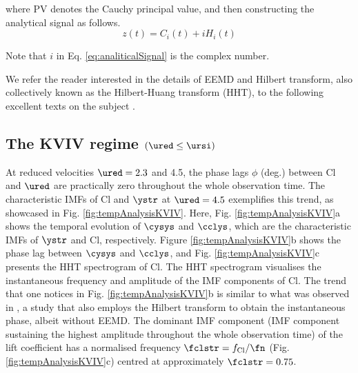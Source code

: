 \documentclass[a4paper,fleqn]{cas-sc}
\begin{document}
\noindent where PV denotes the Cauchy principal value, and then constructing the analytical signal as follows.
\begin{equation}
  z \left( t \right) = C_{i} \left( t \right) + i H_{i} \left( t \right)
  \label{eq:analiticalSignal}
\end{equation}

\noindent Note that $i$ in Eq. \ref{eq:analiticalSignal} is the complex number.

We refer the reader interested in the details of EEMD and Hilbert transform, also collectively known as the Hilbert-Huang transform (HHT), to the following excellent texts on the subject \citep{Huang2005,Huang2014}.
\subsection{The KVIV regime $\left ( \ured \leq \ursi \right )$} \label{ssec:phaseLag}
At reduced velocities  $\ured = 2.3$ and 4.5, the phase lags  $\phi$ (deg.) between Cl and  $\ured$ are practically zero throughout the whole observation time. The characteristic IMFs of Cl and  $\ystr$ at $\ured = 4.5$ exemplifies this trend, as showcased in Fig. \ref{fig:tempAnalysisKVIV}. Here, Fig. \ref{fig:tempAnalysisKVIV}a shows the temporal evolution of $\cysys$ and $\cclys$, which are the characteristic IMFs of $\ystr$ and Cl, respectively. Figure \ref{fig:tempAnalysisKVIV}b shows the phase lag between $\cysys$ and $\cclys$, and Fig. \ref{fig:tempAnalysisKVIV}c presents the HHT spectrogram of Cl. The HHT spectrogram visualises the instantaneous frequency and amplitude of the IMF components of Cl. The trend that one notices in Fig. \ref{fig:tempAnalysisKVIV}b is similar to what was observed in \citet{Khalak1999}, a study that also employs the Hilbert transform to obtain the instantaneous phase, albeit without EEMD. The dominant IMF component (IMF component sustaining the highest amplitude throughout the whole observation time) of the lift coefficient has a normalised frequency $\fclstr = f_{\text{Cl}}/\fn$ (Fig. \ref{fig:tempAnalysisKVIV}c) centred at approximately $\fclstr = 0.75$.
\end{document}
